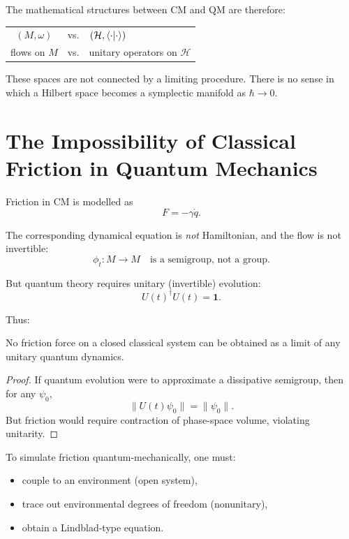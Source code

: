\documentclass[12pt]{article}
\begin{document}
The mathematical structures between CM and QM are therefore:

\begin{center}
\begin{tabular}{c c}
    $(M,\omega)$ & vs. & $(\mathcal{H},\braket{\cdot}{\cdot})$\\
    flows on $M$ & vs. & unitary operators on $\mathcal{H}$
\end{tabular}
\end{center}

These spaces are not connected by a limiting procedure. There is no sense in which a Hilbert space becomes a symplectic manifold as $\hbar\to 0$.

\section{The Impossibility of Classical Friction in Quantum Mechanics}

Friction in CM is modelled as
\[
F = -\gamma \dot{q}.
\]

The corresponding dynamical equation is \emph{not} Hamiltonian, and the flow is not invertible:
\[
\phi_t \colon M \to M \quad \text{is a semigroup, not a group}.
\]

But quantum theory requires unitary (invertible) evolution:
\[
U(t)^\dagger U(t) = \mathbf{1}.
\]

Thus:

\begin{theorem}
No friction force on a closed classical system can be obtained as a limit of any unitary quantum dynamics.
\end{theorem}

\begin{proof}
If quantum evolution were to approximate a dissipative semigroup, then for any $\psi_0$,
\[
\| U(t)\psi_0\| = \|\psi_0\|.
\]
But friction would require contraction of phase-space volume, violating unitarity. 
\end{proof}

To simulate friction quantum-mechanically, one must:

\begin{itemize}
    \item couple to an environment (open system),
    \item trace out environmental degrees of freedom (nonunitary),
    \item obtain a Lindblad-type equation.
\end{itemize}
\end{document}
